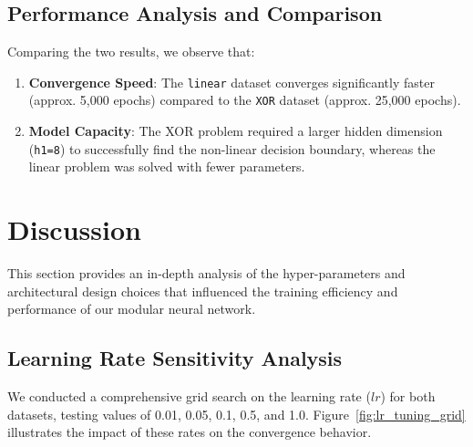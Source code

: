 \documentclass[10pt,twocolumn,letterpaper]{article}
\begin{document}
\subsection{Performance Analysis and Comparison}
Comparing the two results, we observe that:
\begin{enumerate}
    \item \textbf{Convergence Speed}: The \texttt{linear} dataset converges significantly faster (approx. 5,000 epochs) compared to the \texttt{XOR} dataset (approx. 25,000 epochs).
    \item \textbf{Model Capacity}: The XOR problem required a larger hidden dimension (\texttt{h1=8}) to successfully find the non-linear decision boundary, whereas the linear problem was solved with fewer parameters.
\end{enumerate}


\section{Discussion} \label{sec:discuss}

This section provides an in-depth analysis of the hyper-parameters and architectural design choices that influenced the training efficiency and performance of our modular neural network.

\subsection{Learning Rate Sensitivity Analysis}
We conducted a comprehensive grid search on the learning rate ($lr$) for both datasets, testing values of 0.01, 0.05, 0.1, 0.5, and 1.0. Figure~\ref{fig:lr_tuning_grid} illustrates the impact of these rates on the convergence behavior.
\end{document}
